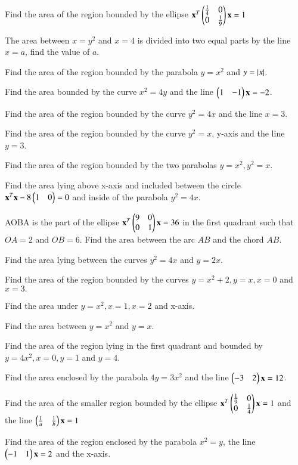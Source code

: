 \item  Find the area of the region bounded by the ellipse 
$
\mathbf{x}^T\begin{pmatrix}\frac{1}{4} & 0 \\ 0 & \frac{1}{9}\end{pmatrix}\mathbf{x} = 1
$
\item The area between $x=y^2$ and $x=4$ is divided into two equal parts by the line $x=a$, find the value of $a$.
\item  Find the area of the region bounded by the parabola $y = x^2$ and $y = \left\vert x\right\vert$.
\item  Find the area bounded by the curve $x^2 = 4y$ and the line $\begin{pmatrix}1 & -1\end{pmatrix}\mathbf{x} = -2$.
\item  Find the area of the region bounded by the curve $y^2 = 4x$ and the line $x = 3$.
%
\item Find the area of the region bounded by the curve $y^2 = x$, y-axis and the line $y = 3$.
%
\item Find the area of the region bounded by the two parabolas $y = x^2, y^2=x$.
\item Find the area lying above x-axis and included between the circle $\mathbf{x}^T\mathbf{x} -8\begin{pmatrix}1 & 0\end{pmatrix}= 0$  and inside of the parabola $y^2 = 4x$.
%
\item AOBA is the part of the ellipse 
$
\mathbf{x}^T\begin{pmatrix}9 & 0 \\ 0 & 1\end{pmatrix}\mathbf{x} = 36
$
in the first quadrant such that $OA = 2$ and $OB = 6$. Find the area between the arc $AB$ and the chord $AB$.
\\
\solution

\item Find the area lying between the curves $y^2 = 4x$ and $y = 2x$.
\item  Find the area of the region bounded by the curves $y = x^2+2, y = x, x = 0$ and $ x = 3.$
%
\item Find the area under $y = x^2, x = 1, x = 2$ and x-axis.
\item Find the area between  $y = x^2$ and $y = x$.
\item Find the area of the region lying in the first quadrant and bounded by $y = 4x^2, x = 0, y = 1$ and $y = 4$.
\item Find the area enclosed by the parabola $4y = 3x^2$ and the line $\begin{pmatrix}-3 & 2\end{pmatrix}\mathbf{x} = 12$.
%
\item Find the area of the smaller region bounded by the ellipse
$
\mathbf{x}^T\begin{pmatrix}\frac{1}{9} & 0 \\ 0 & \frac{1}{4}\end{pmatrix}\mathbf{x} = 1
$
and the line 
$
\begin{pmatrix}\frac{1}{a} & \frac{1}{b}\end{pmatrix}\mathbf{x} = 1
$
\item Find the area of the region enclosed by the parabola $x^2=y$, the line $\begin{pmatrix}-1 & 1\end{pmatrix}\mathbf{x} = 2$ and the x-axis.
